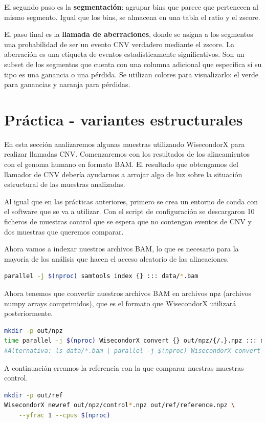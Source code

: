 El segundo paso es la \textbf{segmentación}: agrupar bins que parece que pertenecen al mismo segmento. Igual que los bins, se almacena en una tabla el ratio y el zscore. 

El paso final es la \textbf{llamada de aberraciones}, donde se asigna a los segmentos una probabilidad de ser un evento CNV verdadero mediante el zscore. La aberración es una etiqueta de eventos estadísticamente significativos. Son un subset de los segmentos que cuenta con una columna adicional que especifica si su tipo es una ganancia o una pérdida. Se utilizan colores para visualizarlo: el verde para ganancias y naranja para pérdidas. 

\section{Práctica - variantes estructurales}
En esta sección analizaremos algunas muestras utilizando WisecondorX para realizar llamadas CNV.
Comenzaremos con los resultados de los alineamientos con el genoma humano en formato BAM.
El resultado que obtengamos del llamador de CNV debería ayudarnos a arrojar algo de luz sobre la situación estructural de las muestras analizadas.

Al igual  que en las prácticas anteriores, primero se crea un entorno de conda con el software que se va a utilizar. Con el script de configuración se descargaron 10 ficheros de muestras control que se espera que no contengan eventos de CNV y dos muestras que queremos comparar. 

Ahora vamos a indexar nuestros archivos BAM, lo que es necesario para la mayoría de los análisis que hacen el acceso aleatorio de las alineaciones.
\begin{lstlisting}[language=bash]
parallel -j $(nproc) samtools index {} ::: data/*.bam
\end{lstlisting}

Ahora tenemos que convertir nuestros archivos BAM en archivos npz (archivos numpy arrays comprimidos), que es el formato que WisecondorX utilizará posteriormente.
\begin{lstlisting}[language=bash]
mkdir -p out/npz
time parallel -j $(nproc) WisecondorX convert {} out/npz/{/.}.npz ::: data/*.bam
#Alternativa: ls data/*.bam | parallel -j $(nproc) WisecondorX convert {} out/npz/{/.}.npz
\end{lstlisting}

A continuación creamos la referencia con la que comparar nuestras muestras control.
\begin{lstlisting}[language=bash]
mkdir -p out/ref
WisecondorX newref out/npz/control*.npz out/ref/reference.npz \
    --yfrac 1 --cpus $(nproc)
\end{lstlisting}

